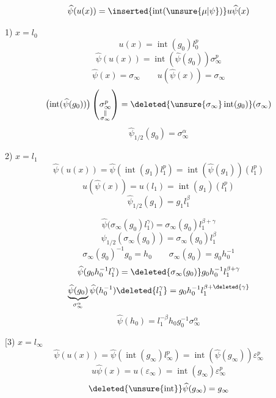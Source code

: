 

\[
\widehat{\psi}(u(x))
=\inserted{\operatorname{int}(\unsure{\mu|\psi})}u\widehat{\psi}(x)
\]

1) \quad $x=l_0$
\[
u(x)=\operatorname{int}(g_0)l_0^p
\]
\[
\widehat{\psi}(u(x))=\operatorname{int}(\widehat{\psi}(g_0))\sigma_\infty^p
\]
\[
\widehat{\psi}(x)=\sigma_\infty
\qquad u(\widehat{\psi}(x))=\sigma_\infty
\]
\[
\bigl(\operatorname{int}(\widehat{\psi}(g_0))\bigr)
\left(\underset{\substack{\Vert\\\sigma_\infty}}{\sigma_\infty^p}\right)
=\deleted{\unsure{\sigma_\infty}\operatorname{int}(g_0)}(\sigma_\infty)
\]
\[
\boxed{\widehat{\psi}_{1/2}(g_0)=\sigma_\infty^\alpha}
\]

2) \quad $x=l_1$
\[
\widehat{\psi}(u(x))
=\widehat{\psi}(\operatorname{int}(g_1)l_1^p)
=\operatorname{int}(\widehat{\psi}(g_1))(l_1^p)
\]
\[
u(\widehat{\psi}(x))=u(l_1)=\operatorname{int}(g_1)(l_1^p)
\]
\[
\boxed{\widehat{\psi}_{1/2}(g_1)=g_1l_1^\beta}
\]

\margin{\[
g_1=g\rho(g_0)=\sigma_\infty(g_0l_0^\gamma)
=\sigma_\infty(g_0)l_1^\gamma
\]}

\[
\widehat{\psi}\bigl(\sigma_\infty(g_0)l_1^\gamma\bigr)
=\sigma_\infty(g_0)l_1^{\beta+\gamma}
\]
\[
\boxed{\widehat{\psi}_{1/2}(\sigma_\infty(g_0))
=\sigma_\infty(g_0)l_1^\beta}
\]
\[
\sigma_\infty(g_0)^{-1}g_0=h_0
\qquad
\sigma_\infty(g_0)=g_0h_0^{-1}
\]
\[
\widehat{\psi}(g_0h_0^{-1}l_1^\gamma)
=\deleted{\sigma_\infty(g_0)}g_0h_0^{-1}l_1^{\beta+\gamma}
\]
\[
\underbrace{\widehat{\psi}(g_0)}_{\sigma_\infty^\alpha}
\widehat{\psi}(h_0^{-1})\deleted{l_1^\gamma}
=g_0h_0^{-1}l_1^{\beta+\deleted{\gamma}}
\]
\[
\widehat{\psi}(h_0)=l_1^{-\beta}h_0g_0^{-1}\sigma_\infty^\alpha
\]

$\bigl[$3) \quad $x=l_\infty$
\[
\widehat{\psi}(u(x))
=\widehat{\psi}(\operatorname{int}(g_\infty)l_\infty^p)
=\operatorname{int}(\widehat{\psi}(g_\infty))\varepsilon_\infty^p
\]
\[
u\widehat{\psi}(x)=u(\varepsilon_\infty)
=\operatorname{int}(g_\infty)\varepsilon_\infty^p
\]
\[
\deleted{\unsure{\operatorname{int}}}\widehat{\psi}(g_\infty)=g_\infty
\]

